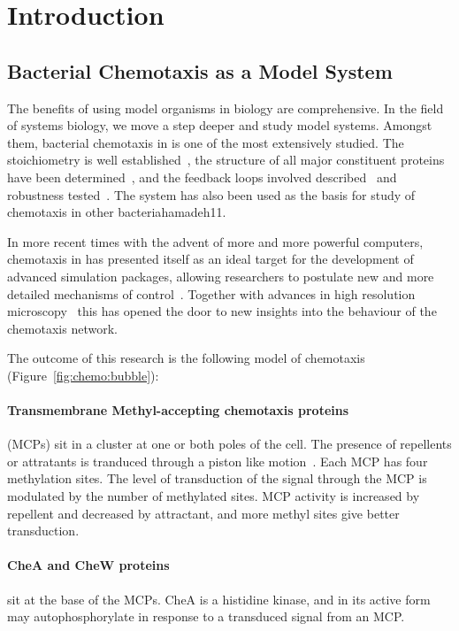 \documentclass[../main.tex]{subfiles}
\begin{document}
\section{Introduction}

\subsection{Bacterial Chemotaxis as a Model System}
The benefits of using model organisms in biology are comprehensive. In the field of systems biology, we move a step deeper and study model systems. Amongst them, bacterial chemotaxis in \ecolilong is one of the most extensively studied. The stoichiometry is well established~\citep{li04}, the structure of all major constituent proteins have been determined~\citep{zhou02, milligan87, stock89}, and the feedback loops involved described~\citep{kentner09} and robustness tested~\citep{yi00}. The \ecoli system has also been used as the basis for study of chemotaxis in other bacteria{hamadeh11}.

In more recent times with the advent of more and more powerful computers, chemotaxis in \ecoli has presented itself as an ideal target for the development of advanced simulation packages, allowing researchers to postulate new and more detailed mechanisms of control~\citep{lipkow05}. Together with advances in high resolution microscopy~\citep{greenfield09} this has opened the door to new insights into the behaviour of the \ecoli chemotaxis network.

The outcome of this research is the following model of chemotaxis (Figure~\ref{fig:chemo:bubble}):

\paragraph{Transmembrane Methyl-accepting chemotaxis proteins} (MCPs) sit in a cluster at one or both poles of the cell. The presence of repellents or attratants is tranduced through a piston like motion~\citep{hall11}. Each MCP has four methylation sites. The level of transduction of the signal through the MCP is modulated by the number of methylated sites. MCP activity is increased by repellent and decreased by attractant, and more methyl sites give better transduction.

\paragraph{CheA and CheW proteins} sit at the base of the MCPs. CheA is a histidine kinase, and in its active form may autophosphorylate in response to a transduced signal from an MCP.
\end{document}
